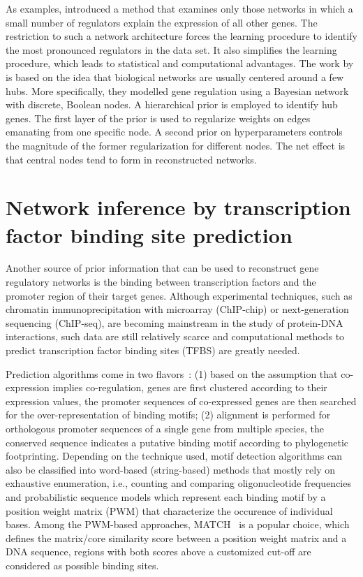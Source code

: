 As examples, \cite{Pe'er2002} introduced a method that examines only
those networks in which a small number of
regulators explain the expression of all other
genes. The restriction to such a
network architecture forces the learning procedure to identify the most pronounced regulators in the data set. It also simplifies the
learning procedure, which leads to statistical
and computational advantages. The work by \cite{Boeck2012} is based on the idea 
that biological 
networks are usually centered around a few hubs. More specifically, they modelled gene regulation using a Bayesian network with discrete, Boolean nodes. A hierarchical prior is employed to identify hub genes. The first layer of the prior is used to regularize weights on edges emanating from one specific node. A second prior on hyperparameters controls the magnitude of the former regularization for different nodes. The net effect is that central nodes tend to form in reconstructed networks.

\section{Network inference by transcription factor binding site prediction}
Another source of prior information that can be used to reconstruct gene
regulatory networks is the binding between transcription factors and the 
promoter region of their target genes. Although experimental techniques,
such as chromatin immunoprecipitation with microarray (ChIP-chip) or 
next-generation sequencing (ChIP-seq), are becoming mainstream in the study
of protein-DNA interactions, such data are still relatively scarce and 
computational methods to predict transcription factor binding sites (TFBS) are
greatly needed. 

Prediction algorithms come in two flavors~\citep{Das2007}: 
(1) based on the
assumption that co-expression implies co-regulation, genes are 
first clustered according to their expression values, the promoter sequences
of co-expressed genes are then searched for the over-representation of 
binding motifs; (2) alignment is performed for orthologous promoter sequences of a single gene from multiple species, the conserved sequence indicates a putative
binding motif according to phylogenetic footprinting. Depending on the 
technique used, motif detection algorithms can also be classified into
word-based (string-based) methods that mostly rely on exhaustive enumeration, i.e., counting and comparing oligonucleotide frequencies and probabilistic sequence models which
represent each binding motif by a position weight matrix (PWM) that characterize
the occurence of individual bases.
Among the PWM-based approaches, MATCH~\citep{Kel2003} is a popular choice, which 
defines the matrix/core similarity score between a position weight matrix and
a DNA sequence, regions with both scores above a customized cut-off are considered
as possible binding sites.


